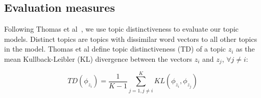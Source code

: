 
\subsection{Evaluation measures}

Following Thomas et al~\cite{Thomas-etal:2011}, we use topic distinctiveness
to evaluate our topic models.
Distinct topics are topics with dissimilar word vectors to all other topics in the model.
Thomas et al define topic distinctiveness (TD) of a topic $z_i$ as the mean
Kullback-Leibler (KL) divergence between the vectors $z_i$ and $z_j$, $\forall j \neq i$:

\begin{equation}
TD(\phi_{z_i}) = 
\frac{1}{K - 1}
\sum_{j=1,j \neq i}^{K}
KL(\phi_{z_i}, \phi_{z_j})
\label{eq:topicdistinctiveness}
\end{equation}

